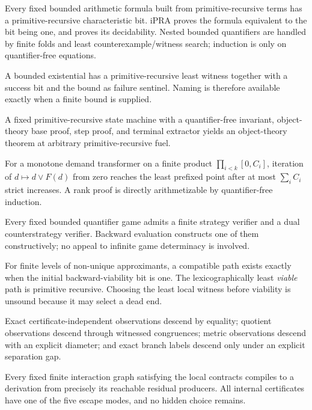 \begin{description}[style=nextline]
\item[Bounded reflection.] Every fixed bounded arithmetic formula built from primitive-recursive terms has a primitive-recursive characteristic bit.  iPRA proves the formula equivalent to the bit being one, and proves its decidability.  Nested bounded quantifiers are handled by finite folds and least counterexample/witness search; induction is only on quantifier-free equations.

\item[Guarded canonical choice.] A bounded existential has a primitive-recursive least witness together with a success bit and the bound as failure sentinel.  Naming is therefore available exactly when a finite bound is supplied.

\item[Fixed-trace reflection.] A fixed primitive-recursive state machine with a quantifier-free invariant, object-theory base proof, step proof, and terminal extractor yields an object-theory theorem at arbitrary primitive-recursive fuel.

\item[Capped cyclic demand closure.] For a monotone demand transformer on a finite product \(\prod_{i<k}[0,C_i]\), iteration of \(d\mapsto d\vee F(d)\) from zero reaches the least prefixed point after at most \(\sum_i C_i\) strict increases.  A rank proof is directly arithmetizable by quantifier-free induction.

\item[Finite strategy extraction.] Every fixed bounded quantifier game admits a finite strategy verifier and a dual counterstrategy verifier.  Backward evaluation constructs one of them constructively; no appeal to infinite game determinacy is involved.

\item[Backward viability.] For finite levels of non-unique approximants, a compatible path exists exactly when the initial backward-viability bit is one.  The lexicographically least \emph{viable} path is primitive recursive.  Choosing the least local witness before viability is unsound because it may select a dead end.

\item[Observer elimination.] Exact certificate-independent observations descend by equality; quotient observations descend through witnessed congruences; metric observations descend with an explicit diameter; and exact branch labels descend only under an explicit separation gap.

\item[Scope normal form.] Every fixed finite interaction graph satisfying the local contracts compiles to a derivation from precisely its reachable residual producers.  All internal certificates have one of the five escape modes, and no hidden choice remains.
\end{description}

